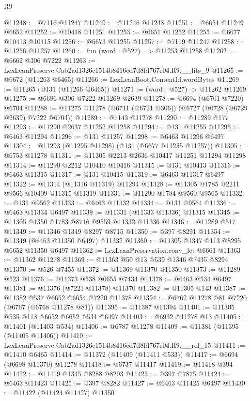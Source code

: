 \begin{lexlean}{R9}
\begin{coremodule}
@11248 := @7116 @11247
@11249 := @11246 @11248
@11251 := @6651 @11249 @6652
@11252 := @10418 @11251
@11253 := @6651 @11252
@11255 := @6677 @10413 @10415
@11256 := @6673 @11255
@11257 := @7119 @11247
@11258 := @11256 @11257
@11260 := fun (word : @527) => @11253 @11258
@11262 := @6662 @306 @7222
@11263 := LexLeanPreserve.Cab2ad1326c1514b8416cd7d8fd767c04.R9.__fits_9
@11265 := @6672 (@11263 @6465)
@11266 := LexLeanBoot.ContentId.wordBytes
@11269 := @11265 (@131 (@11266 @6465))
@11271 := (word : @527) -> @11262 @11269
@11275 := @6686 @306 @7222 @11269 @2639
@11278 := @6694 (@6701 @7220) @6704
@11288 := @11275 @11278 (@6711 (@6721 @306)) (@6727 (@6728 (@6729 @2639) @7222 @6704))
@11289 := @7143 @11278
@11290 := @11289 @177
@11293 := @11290 @2637 @11252 @11258
@11294 := @131 @11255
@11295 := @6463 @11294
@11296 := @131 @11257
@11298 := @6463 @11296 @6497
@11304 := @11293 (@11295 @11298) (@131 (@6677 @11255 @11257))
@11305 := @6753 @11278
@11311 := @11305 @2213 @2636 @10417 @11251 @11294 @11298
@11314 := @11290 @2212 @10410 @10416
@11315 := @131 @10413
@11316 := @6463 @11315
@11317 := @131 @10415
@11319 := @6463 @11317 @6497
@11322 := @11314 (@11316 @11319) @11294
@11328 := @11305 @1785 @2211 @9566 @10409 @11315 @11319
@11331 := @11290 @1784 @9560 @9565
@11332 := @131 @9562
@11333 := @6463 @11332
@11334 := @131 @9564
@11336 := @6463 @11334 @6497
@11339 := @11331 (@11333 @11336) @11315
@11345 := @11305 @1350 @1783 @8716 @9559 @11332 @11336
@11346 := @11289 @517
@11349 := @11346 @1349 @8297 @8715
@11350 := @397 @8291
@11354 := @11349 (@6463 @11350 @6497) @11332
@11360 := @11305 @1347 @113 @8295 @6652 @11350 @6497
@11362 := LexLeanPreservation.conv_let @6661
@11363 := @11362 @11278
@11369 := @11363 @50 @13 @539 @1346 @7435 @8294
@11370 := @526 @7455
@11372 := @11369 @11370 @11350
@11373 := @11289 @523
@11376 := @11373 @538 @6655 @7434
@11378 := @6463 @534 @6497
@11381 := @11376 (@7221 @11378) @11370
@11382 := @11305 @143
@11387 := @11382 @537 @6652 @6654 @7220 @11378
@11394 := @6762 @11278 @81 @7220 (@6767 (@6768 @11278 @81))
@11395 := @11387 @11394
@11401 := @11305 @535 @113 @6652 @6652 @534 @6497
@11403 := @6932 @11278 @13
@11405 := @11401 (@11403 @534)
@11406 := @6787 @11278
@11409 := @11381 (@11395 (@11405 @11406))
@11410 := LexLeanPreserve.Cab2ad1326c1514b8416cd7d8fd767c04.R9.__rel_15
@11411 := @11410 @6465
@11414 := @11372 (@11409 (@11411 @533))
@11417 := @6694 (@6698 @11370) @11278
@11418 := @6737 @11417
@11419 := @11418 @394
@11422 := @11419 @1345 @8288 @8293
@11423 := @397 @7875
@11424 := @6463 @11423
@11425 := @397 @8282
@11427 := @6463 @11425 @6497
@11430 := @11422 (@11424 @11427) @11350

\end{coremodule}
\end{lexlean}
